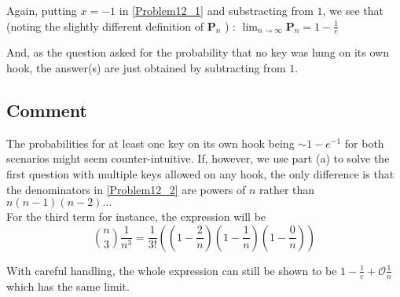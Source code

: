 Again, putting $x = -1$ in \eqref{Problem12_1} and substracting from $1$, we see that (noting the slightly different definition of $\mathbf{P}_n$ ) : 
$\lim_{n \rightarrow \infty} \mathbf{P}_n = 1 - \frac{1}{e} $

And, as the question asked for the probability that no key was hung on its own hook, the answer(s) are just obtained by subtracting from $1$. 

\subsection{Comment}
The probabilities for at least one key on its own hook being $\sim 1 - e^{-1}$ for both scenarios might seem counter-intuitive.
If, however, we use part (a) to solve the first question with multiple keys allowed on any hook, the only difference is that the denominators in \eqref{Problem12_2} are powers of $n$ rather than $n(n-1)(n-2)\ldots$ \\
For the third term for instance, the expression will be 
\begin{equation} 
\binom{n}{3} \frac{1}{n^3} = \frac{1}{3!} \left((1-\frac{2}{n})(1-\frac{1}{n})(1-\frac{0}{n})\right) 
\end{equation}

With careful handling, the whole expression can still be shown to be $1 - \frac{1}{e} + \mathcal{O}\frac{1}{n}$ which has the same limit.
